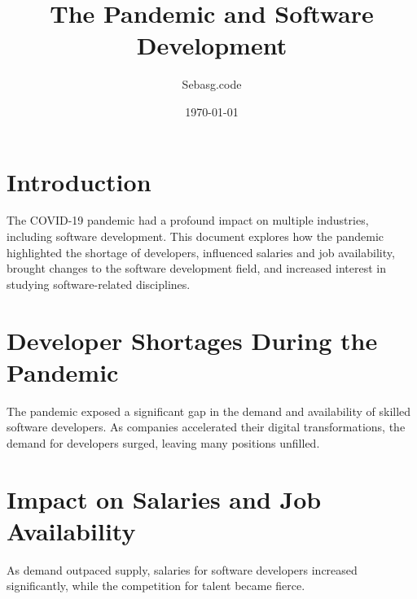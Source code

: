 \documentclass{article}
\title{The Pandemic and Software Development}
\author{Sebasg.code}
\date{\today}
\begin{document}
\maketitle

\section{Introduction}
The COVID-19 pandemic had a profound impact on multiple industries, including software development. This document explores how the pandemic highlighted the shortage of developers, influenced salaries and job availability, brought changes to the software development field, and increased interest in studying software-related disciplines.

\section{Developer Shortages During the Pandemic}
The pandemic exposed a significant gap in the demand and availability of skilled software developers. As companies accelerated their digital transformations, the demand for developers surged, leaving many positions unfilled.


\section{Impact on Salaries and Job Availability}
As demand outpaced supply, salaries for software developers increased significantly, while the competition for talent became fierce.

\end{document}
